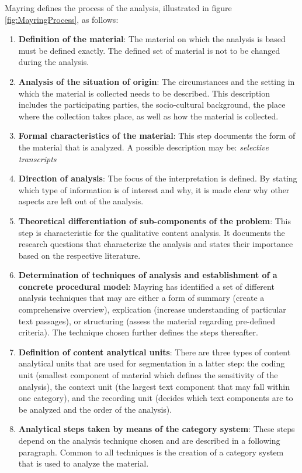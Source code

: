 Mayring defines the process of the analysis, illustrated in figure \ref{fig:MayringProcess}, as follows: 
\begin{enumerate}
    \item \textbf{Definition of the material}: The material on which the analysis is based must be defined exactly. The defined set of material is not to be changed during the analysis.
    \item \textbf{Analysis of the situation of origin}: The circumstances and the setting in which the material is collected needs to be described. This description includes the participating parties, the socio-cultural background, the place where the collection takes place, as well as how the material is collected.
    \item \textbf{Formal characteristics of the material}: This step documents the form of the material that is analyzed. A possible description may be: \textit{selective transcripts}
    \item \textbf{Direction of analysis}: The focus of the interpretation is defined. By stating which type of information is of interest and why, it is made clear why other aspects are left out of the analysis.
    \item \textbf{Theoretical differentiation of sub-components of the problem}: This step is characteristic for the qualitative content analysis. It documents the research questions that characterize the analysis and states their importance based on the respective literature.
    \item \textbf{Determination of techniques of analysis and establishment of a concrete procedural model}: Mayring has identified a set of different analysis techniques that may are either a form of summary (create a comprehensive overview), explication (increase understanding of particular text passages), or structuring (assess the material regarding pre-defined criteria). The technique chosen further defines the steps thereafter.
    \item \textbf{Definition of content analytical units}: There are three types of content analytical units that are used for segmentation in a latter step: the coding unit (smallest component of material which defines the sensitivity of the analysis), the context unit (the largest text component that may fall within one category), and the recording unit (decides which text components are to be analyzed and the order of the analysis).
    \item \textbf{Analytical steps taken by means of the category system}: These steps depend on the analysis technique chosen and are described in a following paragraph. Common to all techniques is the creation of a category system that is used to analyze the material.

\end{enumerate}
